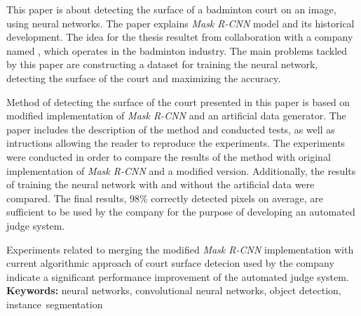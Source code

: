 
This paper is about detecting the surface of a badminton court on an image, using neural networks.
The paper explains \textit{Mask R-CNN} model and its historical development.
The idea for the thesis resultet from collaboration with a company named \blue{}, which operates in the badminton industry.
The main problems tackled by this paper are constructing a dataset for training the neural network, detecting the surface of the court and maximizing the accuracy.

Method of detecting the surface of the court presented in this paper is based on modified implementation of \textit{Mask R-CNN} and an artificial data generator. The paper includes the description of the method and conducted tests, as well as intructions allowing the reader to reproduce the experiments. The experiments were conducted in order to compare the results of the method with original implementation of \textit{Mask R-CNN} and a modified version. Additionally, the results of training the neural network with and without the artificial data were compared. The final results, 98\% correctly detected pixels on average, are sufficient to be used by the \blue{} company for the purpose of developing an automated judge system.

Experiments related to merging the modified \textit{Mask R-CNN} implementation with current algorithmic approach of court surface detecion used by the \blue{} company indicate a significant performance improvement of the automated judge system.
\\

\noindent \textbf{Keywords:} neural networks, convolutional neural networks, object detection, instance~segmentation
